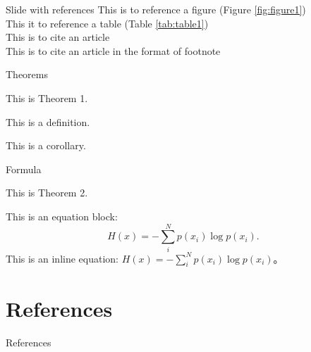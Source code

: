 \documentclass{beamer}
\begin{document}
    \begin{frame}{Slide with references}
        This is to reference a figure (Figure \ref{fig:figure1})\\
        This it to reference a table (Table \ref{tab:table1})\\
        This is to cite an article \cite{vaswani2017attention}\\
        This is to cite an article in the format of footnote 
    \end{frame}

    \begin{frame}{Theorems}
        \begin{theorem}
            This is Theorem 1.
        \end{theorem}
        \begin{definition}
            This is a definition. 
        \end{definition}
        \begin{corollary}
            This is a corollary. 
        \end{corollary}
    \end{frame}

    \begin{frame}{Formula}
        \begin{theorem}
            This is Theorem 2. 
        \end{theorem}
        This is an equation block: 
        \begin{equation}
            H(x)=-\sum\limits_i^Np(x_i)\log p(x_i).
        \end{equation}
        This is an inline equation: $H(x)=-\sum\limits_i^Np(x_i)\log p(x_i)$。
    \end{frame}

    \section{References}

    \begin{frame}[allowframebreaks]{References}
        \printbibliography[heading=none]
    \end{frame}
\end{document}
